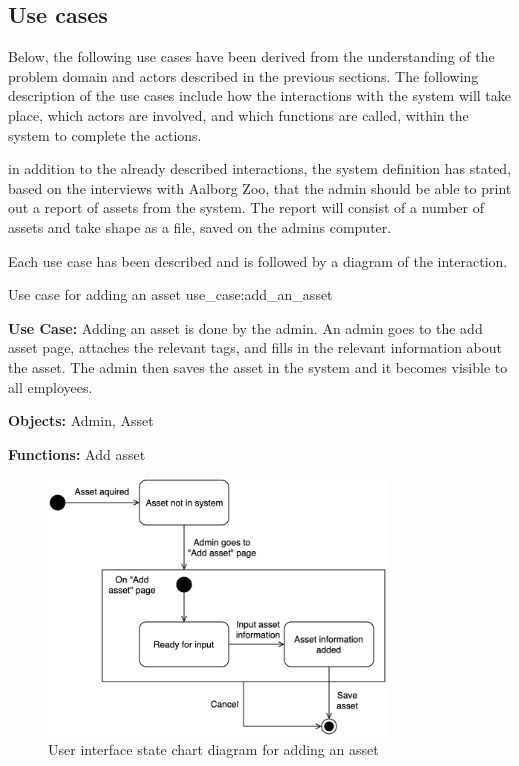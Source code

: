 \subsection{Use cases}\label{ssc:usecases}
Below, the following use cases have been derived from the understanding of the problem domain and actors described in the previous sections. The following description of the use cases include how the interactions with the system will take place, which actors are involved, and which functions are called, within the system to complete the actions.
\par
in addition to the already described interactions, the system definition has stated, based on the interviews with Aalborg Zoo, that the admin should be able to print out a report of assets from the system. The report will consist of a number of assets and take shape as a file, saved on the admins computer.
\par
Each use case has been described and is followed by a diagram of the interaction.
\newline

    {Use case for adding an asset}
    {use_case:add_an_asset}
    {
        \textbf{Use Case:} Adding an asset is done by the admin. An admin goes to the add asset page, attaches the relevant tags, and fills in the relevant information about the asset. The admin then saves the asset in the system and it becomes visible to all employees.
    
        \vskip 0.2cm
        
        \textbf{Objects:} Admin, Asset
        
        \vskip 0.2cm
        
        \textbf{Functions:} Add asset
    }

\begin{figure}[H]
    \centering
    \includegraphics[width=0.8\textwidth]{figures/UseCases/UC_Add_asset.png}
    \caption{User interface state chart diagram for adding an asset}
    \label{fig:add_asset_statechart}
\end{figure}


